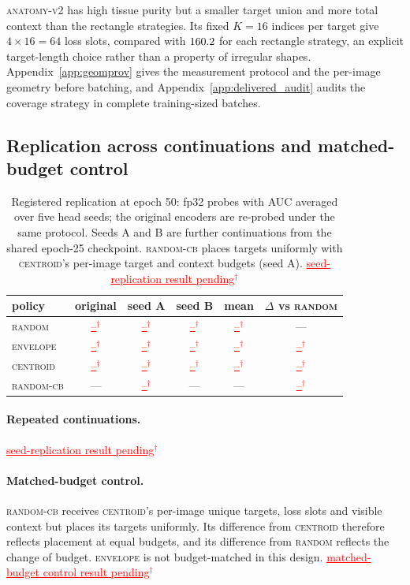 \documentclass{article}
\newcommand{\ph}[1]{\textcolor{red}{\underline{#1}$^{\dagger}$}}
\newcommand{\CRSeedResultsPending}{\ph{seed-replication result pending}}
\newcommand{\CRControlResultsPending}{\ph{matched-budget control result pending}}
\newcommand{\CRCell}{\ph{--}}
\newcommand{\ArmBest}{\textsc{centroid}}
\begin{document}
\textsc{anatomy-v2} has high tissue purity but a smaller target union and
more total context than the rectangle strategies.
Its fixed $K{=}16$ indices per target give $4\times16=64$ loss slots,
compared with $160.2$ for each rectangle strategy, an
explicit target-length choice rather than a property of irregular shapes.
Appendix~\ref{app:geomprov} gives the measurement protocol and the per-image
geometry before batching, and Appendix~\ref{app:delivered_audit} audits the
coverage strategy in complete training-sized batches.

\subsection{Replication across continuations and matched-budget control}
\label{sec:replication}

\begin{table}[t]
\centering
\caption{Registered replication at epoch 50: fp32 probes with AUC averaged over
five head seeds; the original encoders are re-probed under the same protocol.
Seeds A and B are further continuations from the shared epoch-25 checkpoint.
\textsc{random-cb} places targets uniformly with \ArmBest{}'s per-image target
and context budgets (seed A). \CRSeedResultsPending}
\label{tab:replication}
\footnotesize
\begin{tabular}{lccccc}
\toprule
policy & original & seed A & seed B & mean & $\Delta$ vs \textsc{random} \\
\midrule
\textsc{random}   & \CRCell & \CRCell & \CRCell & \CRCell & --- \\
\textsc{envelope} & \CRCell & \CRCell & \CRCell & \CRCell & \CRCell \\
\ArmBest{}        & \CRCell & \CRCell & \CRCell & \CRCell & \CRCell \\
\midrule
\textsc{random-cb} & --- & \CRCell & --- & --- & \CRCell \\
\bottomrule
\end{tabular}
\end{table}

\paragraph{Repeated continuations.} \CRSeedResultsPending

\paragraph{Matched-budget control.} \textsc{random-cb} receives \ArmBest{}'s
per-image unique targets, loss slots and visible context but places
its targets uniformly. Its difference from \ArmBest{} therefore reflects
placement at equal budgets, and its difference from \textsc{random} reflects the
change of budget. \textsc{envelope} is not budget-matched in this design.
\CRControlResultsPending
\end{document}
